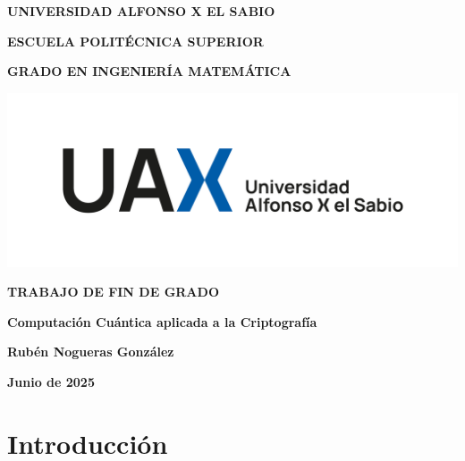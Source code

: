 \documentclass{article}
\numberwithin{equation}{section} %
\begin{document}
    \begin{titlepage}
        \centering
        {\fontsize{18pt}{22pt}\selectfont \textbf{UNIVERSIDAD ALFONSO X EL SABIO}\par}
        \vspace{1cm}
        {\fontsize{16pt}{22pt}\selectfont \textbf{ESCUELA POLITÉCNICA SUPERIOR}\par}
        \vspace{1cm}
        {\fontsize{14pt}{22pt}\selectfont \textbf{GRADO EN INGENIERÍA MATEMÁTICA}\par}
        \vspace{2cm}
        {\includegraphics[width=1\textwidth]{img/portada.png}\par}
        \vspace{0.5cm}
        {\fontsize{20pt}{22pt}\selectfont \textbf{TRABAJO DE FIN DE GRADO}\par}
        \vspace{1cm}
        {\fontsize{14pt}{22pt}\selectfont \textbf{Computación Cuántica aplicada a la Criptografía}\par}
        \vfill
        {\fontsize{14pt}{22pt}\selectfont \textbf{Rubén Nogueras González}\par}
        \vspace{1cm}
        {\fontsize{14pt}{22pt}\selectfont \textbf{Junio de 2025}\par}
    \end{titlepage}
    
    \newpage
    \thispagestyle{empty}
    \mbox{}
    \newpage

    \tableofcontents

    \newpage
    \thispagestyle{empty}
    \mbox{}
    \newpage

    \listoffigures

    \newpage
    \thispagestyle{empty}
    \mbox{}
    \newpage


    \section{Introducción}
\end{document}
